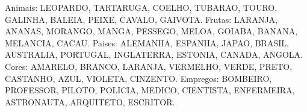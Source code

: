 Animais: LEOPARDO, TARTARUGA, COELHO, TUBARAO, TOURO, GALINHA, BALEIA, PEIXE, CAVALO, GAIVOTA.
Frutas: LARANJA, ANANAS, MORANGO, MANGA, PESSEGO, MELOA, GOIABA, BANANA, MELANCIA, CACAU.
Paises: ALEMANHA, ESPANHA, JAPAO, BRASIL, AUSTRALIA, PORTUGAL, INGLATERRA, ESTONIA, CANADA, ANGOLA.
Cores: AMARELO, BRANCO, LARANJA, VERMELHO, VERDE, PRETO, CASTANHO, AZUL, VIOLETA, CINZENTO.
Empregos: BOMBEIRO, PROFESSOR, PILOTO, POLICIA, MEDICO, CIENTISTA, ENFERMEIRA, ASTRONAUTA, ARQUITETO, ESCRITOR.